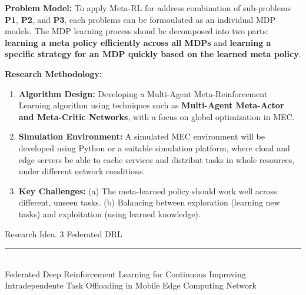 \documentclass[12pt]{article}
\begin{document}
\vspace{0mm}

\noindent\textbf{\large Problem Model: } To apply Meta-RL for address combination of sub-problems  \textbf{P1},  \textbf{P2}, and \textbf{P3}, each problems can be formoulated as an individual MDP models. The MDP learning process shoud be decomposed into two parts: \textbf{learning a meta policy efficiently across all MDPs} and \textbf{learning a specific strategy for an MDP quickly based on the learned meta policy}.
\noindent

\vspace{5mm}

\noindent\textbf{\large Research Methodology:}

\begin{enumerate}  \item \textbf{Algorithm Design:} Developing a Multi-Agent Meta-Reinforcement Learning algorithm using techniques such as \textbf{Multi-Agent Meta-Actor and Meta-Critic Networks}, with a focus on global optimization in MEC.\vspace{-1mm}

\item \textbf{Simulation Environment:} A simulated MEC environment will be developed using Python or a suitable simulation platform, where cload and edge servers be able to cache services and distribut tasks in whole resources, under different network conditions. 
	
\item \textbf{Key Challenges:}  (a) The meta-learned policy should work well across different, unseen tasks. (b) Balancing between exploration (learning new tasks) and exploitation (using learned knowledge). 
\end{enumerate}


\newpage



\begin{center} 
	
	
	\vspace{-17mm}
	
	\large Research Idea. 3  \hfill Federated DRL \vspace{1mm} \hrule
	
	\vspace{-1mm}
	
	
	
	
	\textcolor{white}{i} \\ \LARGE Federated Deep Reinforcement Learning for Continuous Improving Intradependente Task Offloading in Mobile Edge Computing Network\vspace{6mm}\\
	
\end{center}
\vspace{-5mm}
\end{document}
